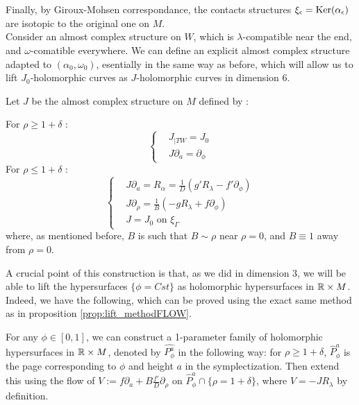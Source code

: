 \documentclass[../main.tex]{subfiles}
\begin{document}
Finally, by Giroux-Mohsen correspondance, the contacts structures $\xi_\epsilon = \text{Ker}(\alpha_\epsilon)$ are isotopic to the original one on $M$. \\

Consider an almost complex structure on $\widehat{W}$, which is $\lambda$-compatible near the end, and $\omega$-comatible everywhere. We can define an explicit almost complex structure adapted to $(\alpha_0,\omega_0)$, esentially in the same way as before, which will allow us to lift $J_0$-holomorphic curves as $J$-holomorphic curves in dimension $6$. 

\begin{definition}\label{d:SHS_ACS_5D}
Let $J$ be the almost complex structure on $M$ defined by : 

For $\rho \geq 1+\delta$ :
\begin{equation}
\left\{
    \begin{array}{ll}
    & J_{|TW} = J_0   \\
    & J\partial_a = \partial_\phi
    \end{array}
\right.
\end{equation}
For $\rho \leq 1+ \delta$ :
\begin{equation}
\left\{
    \begin{array}{ll}
        & J\partial_a = R_\alpha = \frac{1}{D}(g'R_\lambda - f'\partial_\phi) \\
        & J\partial_\rho = \frac{1}{B}(-gR_\lambda + f\partial_\phi) \\
        & J = J_0 \mbox{ on } \xi_\Gamma
    \end{array}
\right.
\end{equation}
where, as mentioned before, $B$ is such that $B\sim \rho$ near $\rho = 0$, and $B \equiv 1$ away from $\rho = 0$.

\end{definition}

A crucial point of this construction is that, as we did in dimension $3$, we will be able to lift the hypersurfaces $\{\phi = Cst\}$ as holomorphic hypersurfaces in $\mathbb{R}\times M$. Indeed, we have the following, which can be proved using the exact same method as in proposition \ref{prop:lift_methodFLOW}.

\begin{proposition}
For any $\phi \in [0,1]$, we can construct a 1-parameter family of holomorphic hypersurfaces in $\mathbb{R}\times M$, denoted by $\hat{P_\phi^a}$ in the following way: for $\rho \geq 1+ \delta$, $\hat{P}_\phi^a$ is the page corresponding to $\phi$ and height $a$ in the symplectization. Then extend this using the flow of $V:= f\partial_a + B\frac{f'}{D}\partial_\rho$ on $\hat{P}_\phi^a\cap \{\rho = 1+\delta\}$, where $V = -JR_\lambda$ by definition. 
\end{proposition}
\end{document}
